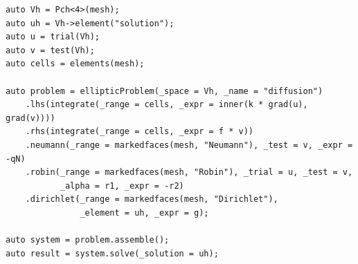 \begin{listing}[H]
        \caption{Variable-coefficient diffusion with the \Feelpp Problem API.}
        \label{lst:feelpp:diffusion-problem-api}
\begin{verbatim}
auto Vh = Pch<4>(mesh);
auto uh = Vh->element("solution");
auto u = trial(Vh);
auto v = test(Vh);
auto cells = elements(mesh);

auto problem = ellipticProblem(_space = Vh, _name = "diffusion")
    .lhs(integrate(_range = cells, _expr = inner(k * grad(u), grad(v))))
    .rhs(integrate(_range = cells, _expr = f * v))
    .neumann(_range = markedfaces(mesh, "Neumann"), _test = v, _expr = -qN)
    .robin(_range = markedfaces(mesh, "Robin"), _trial = u, _test = v,
           _alpha = r1, _expr = -r2)
    .dirichlet(_range = markedfaces(mesh, "Dirichlet"),
               _element = uh, _expr = g);

auto system = problem.assemble();
auto result = system.solve(_solution = uh);
\end{verbatim}
\end{listing}
